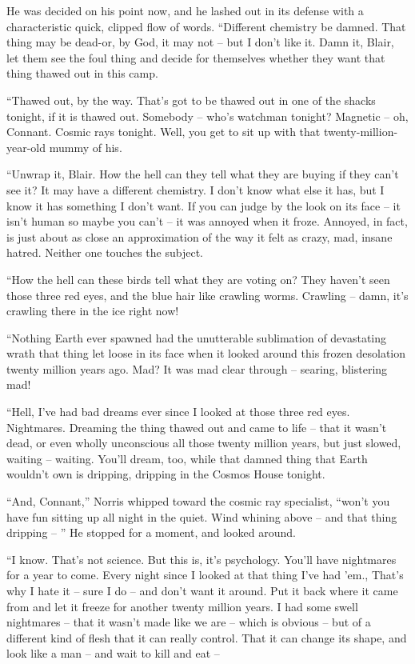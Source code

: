 \documentclass[ebook,oneside,11pt]{memoir}				%
\begin{document}
He was decided on his point now, and he lashed out in its defense with a characteristic quick, clipped flow of words. ``Different chemistry be damned. That thing may be dead-or, by God, it may not -- but I don't like it. Damn it, Blair, let them see the foul thing and decide for themselves whether they want that thing thawed out in this camp.

``Thawed out, by the way. That's got to be thawed out in one of the shacks tonight, if it is thawed out. Somebody -- who's watchman tonight? Magnetic -- oh, Connant. Cosmic rays tonight. Well, you get to sit up with that twenty-million-year-old mummy of his.

``Unwrap it, Blair. How the hell can they tell what they are buying if they can't see it? It may have a different chemistry. I don't know what else it has, but I know it has something I don't want. If you can judge by the look on its face -- it isn't human so maybe you can't -- it was annoyed when it froze. Annoyed, in fact, is just about as close an approximation of the way it felt as crazy, mad, insane hatred. Neither one touches the subject.

``How the hell can these birds tell what they are voting on? They haven't seen those three red eyes, and the blue hair like crawling worms. Crawling -- damn, it's crawling there in the ice right now!

``Nothing Earth ever spawned had the unutterable sublimation of devastating wrath that thing let loose in its face when it looked around this frozen desolation twenty million years ago. Mad? It was mad clear through -- searing, blistering mad!

``Hell, I've had bad dreams ever since I looked at those three red eyes. Nightmares. Dreaming the thing thawed out and came to life -- that it wasn't dead, or even wholly unconscious all those twenty million years, but just slowed, waiting -- waiting. You'll dream, too, while that damned thing that Earth wouldn't own is dripping, dripping in the Cosmos House tonight.

``And, Connant,'' Norris whipped toward the cosmic ray specialist, ``won't you have fun sitting up all night in the quiet. Wind whining above -- and that thing dripping -- '' He stopped for a moment, and looked around.

``I know. That's not science. But this is, it's psychology. You'll have nightmares for a year to come. Every night since I looked at that thing I've had 'em., That's why I hate it -- sure I do -- and don't want it around. Put it back where it came from and let it freeze for another twenty million years. I had some swell nightmares -- that it wasn't made like we are -- which is obvious -- but of a different kind of flesh that it can really control. That it can change its shape, and look like a man -- and wait to kill and eat --
\end{document}
